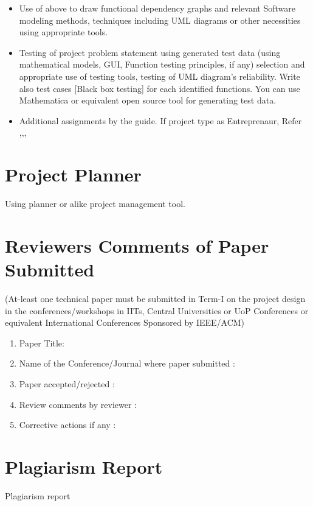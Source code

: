 \documentclass[oneside,a4paper,12pt]{report}
\begin{document}
\begin{normalsize}
\begin{appendices}
\begin{itemize}
\item Use of above to draw functional dependency graphs and relevant Software modeling methods, techniques
including UML diagrams or other necessities using appropriate tools.
\item Testing of project problem statement using generated test data (using mathematical models, GUI, Function testing principles, if any) selection and appropriate use of testing tools, testing of UML diagram's reliability. Write also test cases [Black box testing] for each identified functions. 
You can use Mathematica or equivalent open source tool for generating test data. 
\item Additional assignments by the guide. If project type as Entreprenaur, Refer \cite{ehr},\cite{mckinsey},\cite{mckinseyweb}, \cite{govwebsite}
\end{itemize}


\chapter{Project Planner}
\label{app:plan}
Using planner or alike project management tool.




\chapter{Reviewers Comments of Paper Submitted}
(At-least one technical paper must be submitted in Term-I on the project design in the
conferences/workshops in IITs, Central Universities or UoP Conferences or equivalent International Conferences Sponsored by IEEE/ACM)
\begin{enumerate}
\item Paper Title:
\item Name of the Conference/Journal where paper submitted :
\item Paper accepted/rejected : 
\item Review comments by reviewer :
\item Corrective actions if any :  

\end{enumerate}

\chapter{Plagiarism Report}
Plagiarism report

\end{appendices}
\end{normalsize}
\end{document}
